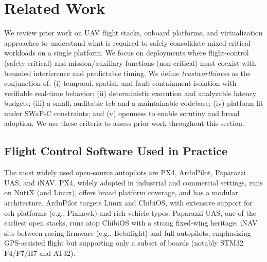 \section{Related Work}
\label{sec:related-work}

We review prior work on UAV flight stacks, onboard platforms, and virtualization
approaches to understand what is required to safely consolidate mixed-critical
workloads on a single platform.
We focus on deployments where flight-control (safety-critical) and
mission/auxiliary functions (non-critical) must coexist with bounded
interference and predictable timing.
We define \emph{trustworthiness} as the conjunction of: (i) temporal, spatial,
and fault-containment isolation with verifiable real-time behavior; (ii)
deterministic execution and analyzable latency budgets; (iii) a small, auditable
\gls{tcb} and a maintainable codebase; (iv) platform fit under SWaP-C
constraints; and (v) openness to enable scrutiny and broad adoption.
We use these criteria to assess prior work throughout this section.


\subsection{Flight Control Software Used in Practice}
\label{subsec:rw-flight-stacks}
The most widely used open-source autopilots are PX4, ArduPilot, Paparazzi UAS,
and iNAV.
PX4, widely adopted in industrial and commercial settings, runs on NuttX (and
Linux), offers broad platform coverage, and has a modular architecture.
ArduPilot targets Linux and ChibiOS, with extensive support for \gls{osh}
platforms (e.g., Pixhawk) and rich vehicle types.
Paparazzi UAS, one of the earliest open stacks, runs atop ChibiOS with a strong
fixed-wing heritage.
iNAV sits between racing firmware (e.g., Betaflight) and full autopilots,
emphasizing GPS-assisted flight but supporting only a subset of boards (notably
STM32 F4/F7/H7 and AT32).

